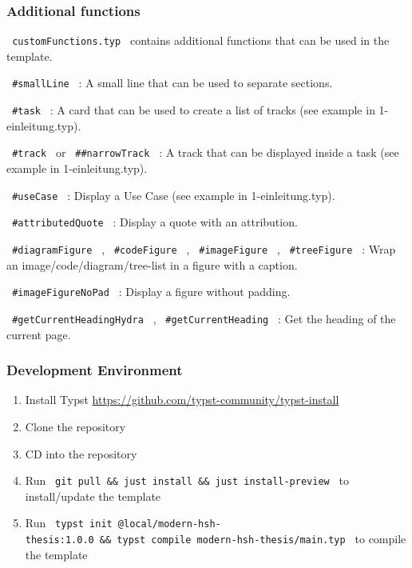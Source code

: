 \subsubsection{Additional functions}\label{additional-functions}

\texttt{\ customFunctions.typ\ } contains additional functions that can
be used in the template.

\texttt{\ \#smallLine\ } : A small line that can be used to separate
sections.

\texttt{\ \#task\ } : A card that can be used to create a list of tracks
(see example in 1-einleitung.typ).

\texttt{\ \#track\ } or \texttt{\ \#\#narrowTrack\ } : A track that can
be displayed inside a task (see example in 1-einleitung.typ).

\texttt{\ \#useCase\ } : Display a Use Case (see example in
1-einleitung.typ).

\texttt{\ \#attributedQuote\ } : Display a quote with an attribution.

\texttt{\ \#diagramFigure\ } , \texttt{\ \#codeFigure\ } ,
\texttt{\ \#imageFigure\ } , \texttt{\ \#treeFigure\ } : Wrap an
image/code/diagram/tree-list in a figure with a caption.

\texttt{\ \#imageFigureNoPad\ } : Display a figure without padding.

\texttt{\ \#getCurrentHeadingHydra\ } , \texttt{\ \#getCurrentHeading\ }
: Get the heading of the current page.

\subsubsection{Development Environment}\label{development-environment}

\begin{enumerate}
\tightlist
\item
  Install Typst \url{https://github.com/typst-community/typst-install}
\item
  Clone the repository
\item
  CD into the repository
\item
  Run
  \texttt{\ git\ pull\ \&\&\ just\ install\ \&\&\ just\ install-preview\ }
  to install/update the template
\item
  Run
  \texttt{\ typst\ init\ @local/modern-hsh-thesis:1.0.0\ \&\&\ typst\ compile\ modern-hsh-thesis/main.typ\ }
  to compile the template
\end{enumerate}

